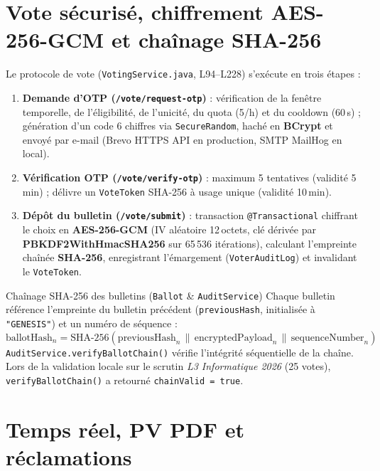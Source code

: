 \section{Vote sécurisé, chiffrement AES-256-GCM et chaînage SHA-256}

Le protocole de vote (\texttt{VotingService.java}, L94--L228) s'exécute en trois étapes :
\begin{enumerate}
    \item \textbf{Demande d'OTP (\texttt{/vote/request-otp})} : vérification de la fenêtre temporelle, de l'éligibilité, de l'unicité, du quota (5/h) et du cooldown (60\,s) ; génération d'un code 6 chiffres via \texttt{SecureRandom}, haché en \textbf{BCrypt} et envoyé par e-mail (Brevo HTTPS API en production, SMTP MailHog en local).
    \item \textbf{Vérification OTP (\texttt{/vote/verify-otp})} : maximum 5 tentatives (validité 5\,min) ; délivre un \texttt{VoteToken} SHA-256 à usage unique (validité 10\,min).
    \item \textbf{Dépôt du bulletin (\texttt{/vote/submit})} : transaction \texttt{@Transactional} chiffrant le choix en \textbf{AES-256-GCM} (IV aléatoire 12\,octets, clé dérivée par \textbf{PBKDF2WithHmacSHA256} sur 65\,536 itérations), calculant l'empreinte chaînée \textbf{SHA-256}, enregistrant l'émargement (\texttt{VoterAuditLog}) et invalidant le \texttt{VoteToken}.
\end{enumerate}

\begin{uaszbox}{Chaînage SHA-256 des bulletins (\texttt{Ballot} \& \texttt{AuditService})}
Chaque bulletin référence l'empreinte du bulletin précédent (\texttt{previousHash}, initialisée à \texttt{"GENESIS"}) et un numéro de séquence :
$$\text{ballotHash}_n = \text{SHA-256}\left(\text{previousHash}_n \,\|\, \text{encryptedPayload}_n \,\|\, \text{sequenceNumber}_n\right)$$
\texttt{AuditService.verifyBallotChain()} vérifie l'intégrité séquentielle de la chaîne. Lors de la validation locale sur le scrutin \textit{L3 Informatique 2026} (25 votes), \texttt{verifyBallotChain()} a retourné \texttt{chainValid = true}.
\end{uaszbox}

\section{Temps réel, PV PDF et réclamations}

